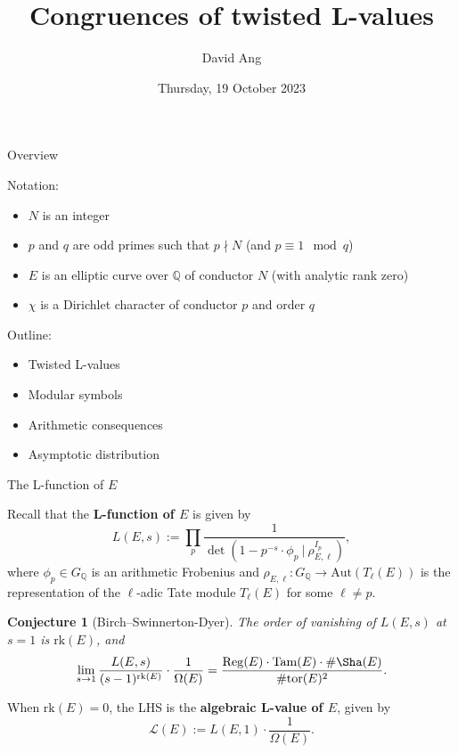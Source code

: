 \documentclass[10pt]{beamer}
\title{Congruences of twisted L-values}
\author{David Ang}
\institute{University College London}
\date{Thursday, 19 October 2023}
\newtheorem{conjecture}{Conjecture}
\begin{document}
\frame{\titlepage}

\begin{frame}{Overview}

Notation:
\begin{itemize}
\item $ N $ is an integer
\item $ p $ and $ q $ are odd primes such that $ p \nmid N $ (and $ p \equiv 1 \mod q $)
\item $ E $ is an elliptic curve over $ \mathbb{Q} $ of conductor $ N $ (with analytic rank zero)
\item $ \chi $ is a Dirichlet character of conductor $ p $ and order $ q $
\end{itemize}

\pause

\vspace{0.5cm} Outline:
\begin{itemize}
\item Twisted L-values
\item Modular symbols
\item Arithmetic consequences
\item Asymptotic distribution
\end{itemize}

\end{frame}

\begin{frame}[t]{The L-function of $ E $}

Recall that the \textbf{L-function of $ E $} is given by
$$ L(E, s) := \prod_p \dfrac{1}{\det(1 - p^{-s} \cdot \phi_p \ | \ \rho_{E, \ell}^{I_p})}, $$
where $ \phi_p \in G_\mathbb{Q} $ is an arithmetic Frobenius and $ \rho_{E, \ell} : G_\mathbb{Q} \to \mathrm{Aut}(T_\ell(E)) $ is the representation of the $ \ell $-adic Tate module $ T_\ell(E) $ for some $ \ell \ne p $.

\pause

\begin{conjecture}[Birch--Swinnerton-Dyer]
The order of vanishing of $ L(E, s) $ at $ s = 1 $ is $ \mathrm{rk}(E) $, and
$$ \lim_{s \to 1} \dfrac{L(E, s)}{(s - 1)^{\mathrm{rk}(E)}} \cdot \dfrac{1}{\Omega(E)} = \dfrac{\mathrm{Reg}(E) \cdot \mathrm{Tam}(E) \cdot \#\Sha(E)}{\#\mathrm{tor}(E)^2}. $$
\end{conjecture}

\pause

When $ \mathrm{rk}(E) = 0 $, the LHS is the \textbf{algebraic L-value of $ E $}, given by
$$ \mathcal{L}(E) := L(E, 1) \cdot \dfrac{1}{\Omega(E)}. $$

\end{frame}
\end{document}
